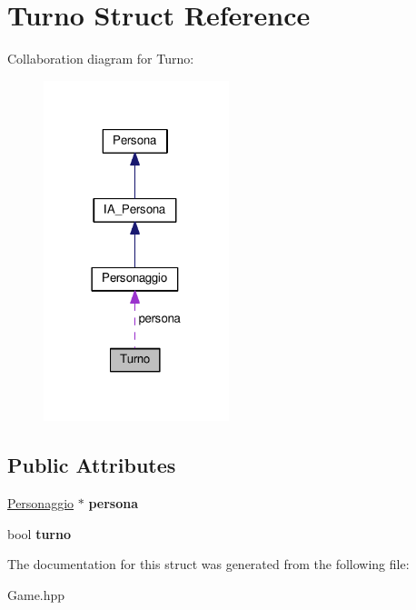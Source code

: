 \hypertarget{structTurno}{}\section{Turno Struct Reference}
\label{structTurno}


Collaboration diagram for Turno\+:\nopagebreak
\begin{figure}[H]
\begin{center}
\leavevmode
\includegraphics[width=153pt]{structTurno__coll__graph}
\end{center}
\end{figure}
\subsection*{Public Attributes}
\begin{DoxyCompactItemize}
\item 
\hypertarget{structTurno_ab77100d524ed9ee84e72a95f910e5d8d}{}\hyperlink{classPersonaggio}{Personaggio} $\ast$ {\bfseries persona}\label{structTurno_ab77100d524ed9ee84e72a95f910e5d8d}

\item 
\hypertarget{structTurno_ae46461bb7036c1062144ec467f62921c}{}bool {\bfseries turno}\label{structTurno_ae46461bb7036c1062144ec467f62921c}

\end{DoxyCompactItemize}


The documentation for this struct was generated from the following file\+:\begin{DoxyCompactItemize}
\item 
Game.\+hpp\end{DoxyCompactItemize}
